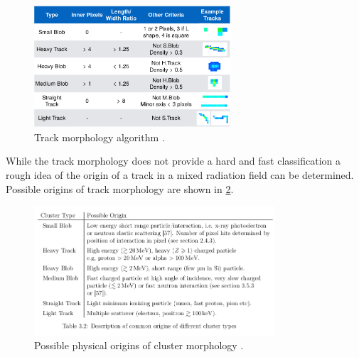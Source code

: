 \begin{figure}[H]
	\begin{center}
	\includegraphics[width=0.65\textwidth]{figures/stuartgraphic.pdf}
	\caption{Track morphology algorithm \cite{stuartalgo}.}
	\label{stuart_algo}
	\end{center}
\end{figure}

While the track morphology does not provide a hard and fast classification a rough idea of the origin of a track in a mixed radiation field can be determined. Possible origins of track morphology are shown in \ref{track_morphology}.

\begin{figure}[H]
	\begin{center}
	\includegraphics[width=0.8\textwidth]{figures/cluster_types.png}
	\caption{Possible physical origins of cluster morphology \cite{stuartthesis}.}
	\label{track_morphology}
	\end{center}
\end{figure}
